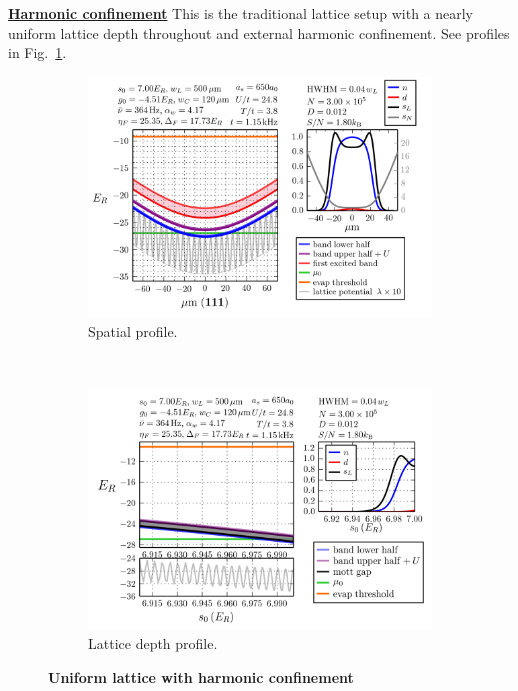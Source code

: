 \vspace{-1em}
\begin{myblock} 
  \underline{ \textbf{Harmonic confinement}} \newline  This is the traditional
lattice setup with a nearly uniform lattice depth throughout and external
harmonic confinement. See profiles in Fig.~\ref{fig:compare02}. 
\end{myblock} 
\begin{figure}
        \centering
        \begin{subfigure}[t]{0.49\textwidth}
		\includegraphics[width=\textwidth]{../figures/lda_evap/figures_hubbard-lda/Flat/008.png}
\caption{Spatial profile. }
        \end{subfigure}%
        ~~ %
        \begin{subfigure}[t]{0.49\textwidth}
		\includegraphics[width=\textwidth]{../figures/lda_evap/figures_hubbard-lda/Flat/Mathy/008.png}
\caption{Lattice depth profile.}
        \end{subfigure}
	\caption{ 
\textbf{Uniform lattice with harmonic confinement}
  }
\label{fig:compare02}
\end{figure}

